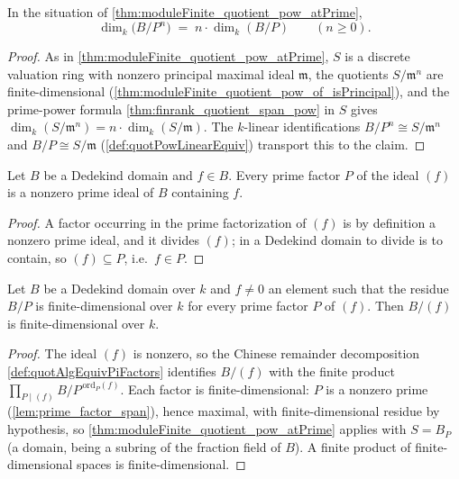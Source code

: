 \begin{theorem}
  \label{thm:finrank_quotient_pow_atPrime}
  \leanok
  In the situation of \ref{thm:moduleFinite_quotient_pow_atPrime},
  \[
    \dim_k\bigl(B/P^n\bigr) \;=\; n \cdot \dim_k(B/P)
    \qquad (n \ge 0).
  \]
\end{theorem}
\begin{proof}
  \leanok
  As in \ref{thm:moduleFinite_quotient_pow_atPrime}, \(S\) is a discrete valuation
  ring with nonzero principal maximal ideal \(\mathfrak m\), the quotients
  \(S/\mathfrak m^n\) are finite-dimensional
  (\ref{thm:moduleFinite_quotient_pow_of_isPrincipal}), and the prime-power formula
  \ref{thm:finrank_quotient_span_pow} in \(S\) gives
  \(\dim_k(S/\mathfrak m^n) = n \cdot \dim_k(S/\mathfrak m)\). The \(k\)-linear
  identifications \(B/P^n \cong S/\mathfrak m^n\) and \(B/P \cong S/\mathfrak m\)
  (\ref{def:quotPowLinearEquiv}) transport this to the claim.
\end{proof}

\begin{lemma}
  \label{lem:prime_factor_span}
  \leanok
  Let \(B\) be a Dedekind domain and \(f \in B\). Every prime factor \(P\) of the
  ideal \((f)\) is a nonzero prime ideal of \(B\) containing \(f\).
\end{lemma}
\begin{proof}
  \leanok
  A factor occurring in the prime factorization of \((f)\) is by definition a nonzero
  prime ideal, and it divides \((f)\); in a Dedekind domain to divide is to contain,
  so \((f) \subseteq P\), i.e.\ \(f \in P\).
\end{proof}

\begin{theorem}
  \label{thm:moduleFinite_quotient_span}
  \leanok
  Let \(B\) be a Dedekind domain over \(k\) and \(f \neq 0\) an element such that the
  residue \(B/P\) is finite-dimensional over \(k\) for every prime factor \(P\) of
  \((f)\). Then \(B/(f)\) is finite-dimensional over \(k\).
\end{theorem}
\begin{proof}
  \leanok
  The ideal \((f)\) is nonzero, so the Chinese remainder decomposition
  \ref{def:quotAlgEquivPiFactors} identifies \(B/(f)\) with the finite product
  \(\prod_{P \mid (f)} B/P^{\,\mathrm{ord}_P(f)}\). Each factor is
  finite-dimensional: \(P\) is a nonzero prime (\ref{lem:prime_factor_span}), hence
  maximal, with finite-dimensional residue by hypothesis, so
  \ref{thm:moduleFinite_quotient_pow_atPrime} applies with \(S = B_P\) (a domain,
  being a subring of the fraction field of \(B\)). A finite product of
  finite-dimensional spaces is finite-dimensional.
\end{proof}

